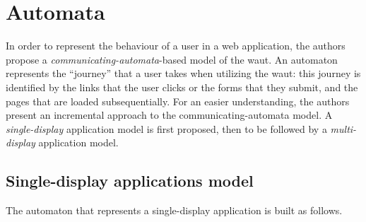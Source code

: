 \documentclass[a4paper,10pt]{article}
\theoremstyle{plain} %
\theoremstyle{definition}
\theoremstyle{remark}
\begin{document}
\section{Automata}

In order to represent the behaviour of a user in a web application, the authors propose a \emph{communicating-automata}-based model of the \gls{waut}. An automaton represents the ``journey'' that a user takes when utilizing the \gls{waut}: this journey is identified by the links that the user clicks or the forms that they submit, and the pages that are loaded subsequentially. For an easier understanding, the authors present an incremental approach to the communicating-automata model. A \textit{single-display} application model is first proposed, then to be followed by a \textit{multi-display} application model.

\subsection{Single-display applications model}
\label{single-display-applications}


The automaton that represents a single-display application is built as follows.
\end{document}
